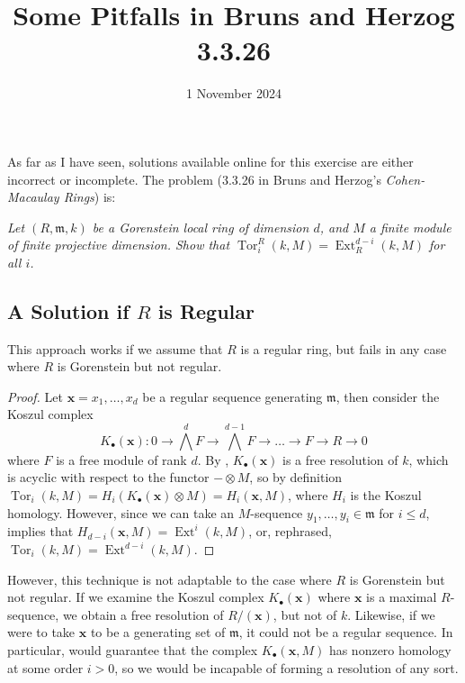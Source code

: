 \documentclass[11pt]{article}
\title{Some Pitfalls in Bruns and Herzog 3.3.26}
\date{1 November 2024}
\newcommand{\BExcerpt}{}
\newcommand{\EExcerpt}{}
\DeclareMathOperator{\Tor}{Tor}
\DeclareMathOperator{\Ext}{Ext}
\begin{document}
    \maketitle

    As far as I have seen, solutions available online for this exercise are either incorrect or incomplete. The problem (3.3.26 in Bruns and Herzog's \textit{Cohen-Macaulay Rings}) is:
    
    \BExcerpt
    \textit{Let \((R, \mathfrak{m}, k)\) be a Gorenstein local ring of dimension \(d\), and \(M\) a finite module of finite projective dimension. Show that \(\Tor_i^R(k, M) = \Ext_R^{d-i}(k,M)\) for all \(i\).}
    \EExcerpt

    \subsection*{A Solution if \(R\) is Regular}
    This approach works if we assume that \(R\) is a regular ring, but fails in any case where \(R\) is Gorenstein but not regular. 
    \begin{proof}
        Let \(\boldsymbol{x} = x_1, \dots, x_d\) be a regular sequence generating \(\mathfrak{m}\), then consider the Koszul complex \[K_\bullet(\boldsymbol{x}): 0 \to \bigwedge^d F \to \bigwedge^{d-1} F \to \dots \to F \to R \to 0\] where \(F\) is a free module of rank \(d\). By \autocite[Cor. 1.6.14]{BH98}, \(K_\bullet(\boldsymbol{x})\) is a free resolution of \(k\), which is acyclic with respect to the functor \(- \otimes M\), so by definition \(\Tor_i(k, M) = H_i(K_\bullet(\boldsymbol{x}) \otimes M) = H_i(\boldsymbol{x}, M)\), where \(H_i\) is the Koszul homology. However, since we can take an \(M\)-sequence \(y_1, \dots, y_i \in \mathfrak{m}\) for \(i \leq d\), \autocite[Thm. 1.6.16]{BH98} implies that \(H_{d-i}(\boldsymbol{x}, M) = \Ext^i(k, M)\), or, rephrased, \(\Tor_i(k, M) = \Ext^{d-i}(k,M)\).
    \end{proof}

    However, this technique is not adaptable to the case where \(R\) is Gorenstein but not regular. If we examine the Koszul complex \(K_\bullet(\boldsymbol{x})\) where \(\boldsymbol{x}\) is a maximal \(R\)-sequence, we obtain a free resolution of \(R/(\boldsymbol{x})\), but not of \(k\). Likewise, if we were to take \(\boldsymbol{x}\) to be a generating set of \(\mathfrak{m}\), it could not be a regular sequence. In particular, \autocite[Thm 1.6.17]{BH98} would guarantee that the complex \(K_\bullet(\boldsymbol{x}, M)\) has nonzero homology at some order \(i > 0\), so we would be incapable of forming a resolution of any sort.
\end{document}
